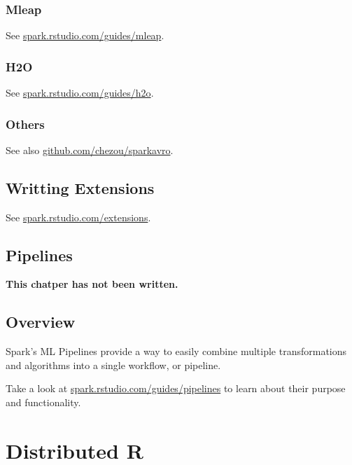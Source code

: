 \documentclass[]{book}
\theoremstyle{definition}
\theoremstyle{definition}
\theoremstyle{definition}
\theoremstyle{remark}
\begin{document}
\hypertarget{mleap}{%
\subsection{Mleap}\label{mleap}}

See
\href{http://spark.rstudio.com/guides/mleap/}{spark.rstudio.com/guides/mleap}.

\hypertarget{h2o}{%
\subsection{H2O}\label{h2o}}

See
\href{http://spark.rstudio.com/guides/h2o/}{spark.rstudio.com/guides/h2o}.

\hypertarget{others}{%
\subsection{Others}\label{others}}

See also
\href{https://github.com/chezou/sparkavro}{github.com/chezou/sparkavro}.

\hypertarget{writting-extensions}{%
\section{Writting Extensions}\label{writting-extensions}}

See
\href{http://spark.rstudio.com/extensions/}{spark.rstudio.com/extensions}.

\hypertarget{pipelines}{%
\section{Pipelines}\label{pipelines}}

\textbf{This chatper has not been written.}

\hypertarget{overview-5}{%
\section{Overview}\label{overview-5}}

Spark's ML Pipelines provide a way to easily combine multiple
transformations and algorithms into a single workflow, or pipeline.

Take a look at
\href{http://spark.rstudio.com/guides/pipelines/}{spark.rstudio.com/guides/pipelines}
to learn about their purpose and functionality.

\hypertarget{distributed}{%
\chapter{Distributed R}\label{distributed}}
\end{document}
